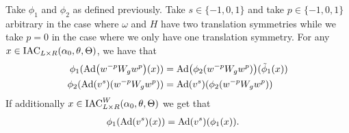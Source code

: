\documentclass[11pt,a4paper,twoside]{article}
\numberwithin{equation}{section}
\begin{document}
	\begin{lemma}\label{lem:phi1phi2matchingCondition}
		Take $\phi_1$ and $\phi_2$ as defined previously. Take $s\in\{-1,0,1\}$ and take $p\in\{-1,0,1\}$ arbitrary in the case where $\omega$ and $H$ have two translation symmetries while we take $p=0$ in the case where we only have one translation symmetry. For any $x\in\textrm{IAC}_{L\times R}(\alpha_0,\theta,\Theta)$, we have that
		\begin{align}
			\phi_1(\Ad{w^{-p} W_g w^{p}}(x))&=\Ad{\phi_2(w^{-p} W_g w^{p})}(\phiTilde_1(x))\\
			\phi_2(\Ad{v^s}(w^{-p} W_gw^{p}))&=\Ad{v^s}(\phi_2(w^{-p} W_g w^{p}))
		\end{align}
		If additionally $x\in\textrm{IAC}_{L\times R}^W(\alpha_0,\theta,\Theta)$ we get that
		\begin{align}
			\phi_1(\Ad{v^{s}}(x))&=\Ad{v^{s}}(\phi_1(x)).
		\end{align}
	\end{lemma}
\end{document}
